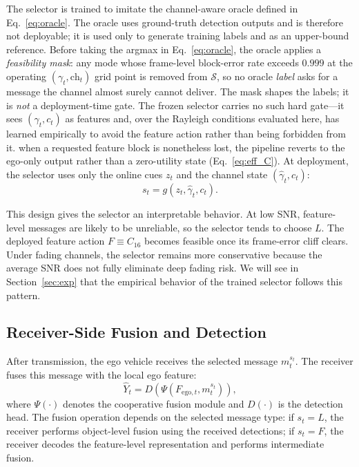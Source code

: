 \documentclass[journal]{IEEEtran}
\begin{document}
The selector is trained to imitate the channel-aware oracle defined in Eq.~\eqref{eq:oracle}. The oracle uses ground-truth detection outputs and is therefore not deployable; it is used only to generate training labels and as an upper-bound reference. Before taking the argmax in Eq.~\eqref{eq:oracle}, the oracle applies a \emph{feasibility mask}: any mode whose frame-level block-error rate exceeds $0.999$ at the operating $(\gamma_t,\mathrm{ch}_t)$ grid point is removed from $\mathcal{S}$, so no oracle \emph{label} asks for a message the channel almost surely cannot deliver. The mask shapes the labels; it is \emph{not} a deployment-time gate. The frozen selector carries no such hard gate---it sees $(\hat\gamma_t, c_t)$ as features and, over the Rayleigh conditions evaluated here, has learned empirically to avoid the feature action rather than being forbidden from it. when a requested feature block is nonetheless lost, the pipeline reverts to the ego-only output rather than a zero-utility state (Eq.~\eqref{eq:eff_C}). At deployment, the selector uses only the online cues $z_t$ and the channel state $(\hat\gamma_t,c_t)$:
\begin{equation}
s_t = g(z_t,\hat\gamma_t,c_t).
\end{equation}

This design gives the selector an interpretable behavior. At low SNR, feature-level messages are likely to be unreliable, so the selector tends to choose $L$. The deployed feature action $F \equiv C_{16}$ becomes feasible once its frame-error cliff clears. Under fading channels, the selector remains more conservative because the average SNR does not fully eliminate deep fading risk. We will see in Section~\ref{sec:exp} that the empirical behavior of the trained selector follows this pattern.

\subsection{Receiver-Side Fusion and Detection}

After transmission, the ego vehicle receives the selected message $m_t^{s_t}$. The receiver fuses this message with the local ego feature:
\begin{equation}
\hat{Y}_t = D\left( \Psi(F_{\mathrm{ego},t}, m_t^{s_t}) \right),
\end{equation}
where $\Psi(\cdot)$ denotes the cooperative fusion module and $D(\cdot)$ is the detection head. The fusion operation depends on the selected message type: if $s_t=L$, the receiver performs object-level fusion using the received detections; if $s_t=F$, the receiver decodes the feature-level representation and performs intermediate fusion.
\end{document}
